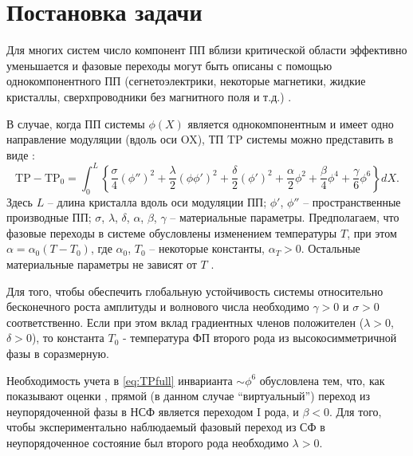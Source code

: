 
\chapter{Постановка задачи}\label{ch:task}

Для многих систем число компонент ПП вблизи критической области эффективно уменьшается и фазовые переходы могут быть описаны с помощью однокомпонентного ПП (сегнетоэлектрики, некоторые магнетики, жидкие кристаллы, сверхпроводники без магнитного поля и т.д.) \cite{Toledano1994, Izjumov1987, Buzdin1986}.

В случае, когда ПП системы $\phi(X)$ является однокомпонентным и имеет одно направление модуляции (вдоль оси OX), ТП $\mathrm{TP}$ системы  можно представить в виде \cite{Vysochanskii1994, Vysochanskii1990, Ema1990}:
\begin{equation}
\mathrm{TP} - \mathrm{TP}_0 = 
 	                      \int^L_0 \left\{\frac{\sigma}{4} \left( \phi'' \right)^2 + 
 	                      \frac{\lambda}{2}\left(\phi\phi'\right)^2 + 
 	                      \frac{\delta}{2}\left(\phi'\right)^2 +
 	                      \frac{\alpha}{2}\phi^2 + \frac{\beta}{4}\phi^4 + 
 	                      \frac{\gamma}{6}\phi^6
 	                      \right\} dX.
\label{eq:TPfull}
\end{equation}
Здесь  $L$ -- длина кристалла вдоль оси модуляции ПП;  $\phi'$, $\phi''$ -- пространственные производные ПП; $\sigma$, $\lambda$, $\delta$, $\alpha$, $\beta$, $\gamma$ -- материальные параметры.
Предполагаем, что фазовые переходы в системе обусловлены изменением температуры $T$, при этом $\alpha = \alpha_0(T-T_0)$, где $\alpha_0$, $T_0$ -- некоторые константы, $\alpha_T > 0$.
Остальные материальные параметры не зависят от $T$ \cite{Vysochanskii1994}.

Для того, чтобы обеспечить глобальную устойчивость системы относительно бесконечного роста амплитуды и волнового числа необходимо $\gamma > 0$ и $\sigma > 0$ соответственно.
Если при этом вклад градиентных членов положителен ($\lambda >0$, $\delta > 0$), то константа $T_0$ - температура ФП второго рода из высокосимметричной фазы в соразмерную.

Необходимость учета в \eqref{eq:TPfull} инварианта $\sim\phi^6$ обусловлена тем, что, как показывают оценки \cite{Vysochanskii1994}, прямой (в данном случае ``виртуальный'') переход из неупорядоченной фазы в НСФ является переходом I рода, и $\beta < 0$.
Для того, чтобы экспериментально наблюдаемый фазовый переход из СФ в неупорядоченное состояние  был второго рода необходимо $\lambda > 0$.

